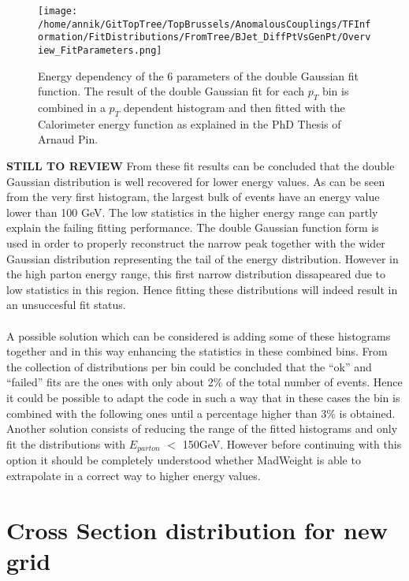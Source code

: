 \begin{figure}[!h]
  \centering
  \texttt{[image: /home/annik/GitTopTree/TopBrussels/AnomalousCouplings/TFInformation/FitDistributions/FromTree/BJet\_DiffPtVsGenPt/Overview\_FitParameters.png]}
  \caption{Energy dependency of the 6 parameters of the double Gaussian fit function. The result of the double Gaussian fit for each $p_T$ bin is combined in a $p_T$ dependent histogram and then fitted with the Calorimeter energy function as explained in the PhD Thesis of Arnaud Pin.} \label{fig::FitParamsBJetPt}
\end{figure}

\newpage
\textbf{STILL TO REVIEW}
\newpage
From these fit results can be concluded that the double Gaussian distribution is well recovered for lower energy values. As can be seen from the very first histogram, the largest bulk of events have an energy value lower than 100 GeV. The low statistics in the higher energy range can partly explain the failing fitting performance. The double Gaussian function form is used in order to properly reconstruct the narrow peak together with the wider Gaussian distribution representing the tail of the energy distribution. However in the high parton energy range, this first narrow distribution dissapeared due to low statistics in this region. Hence fitting these distributions will indeed result in an unsuccesful fit status.\\
\\
A possible solution which can be considered is adding some of these histograms together and in this way enhancing the statistics in these combined bins. From the collection of distributions per bin could be concluded that the ``ok'' and ``failed'' fits are the ones with only about 2$\%$ of the total number of events. Hence it could be possible to adapt the code in such a way that in these cases the bin is combined with the following ones until a percentage higher than 3$\%$ is obtained.\\
Another solution consists of reducing the range of the fitted histograms and only fit the distributions with $E_{parton}$ $<$ 150GeV. However before continuing with this option it should be completely understood whether MadWeight is able to extrapolate in a correct way to higher energy values.

\newpage
\section{Cross Section distribution for new grid}

